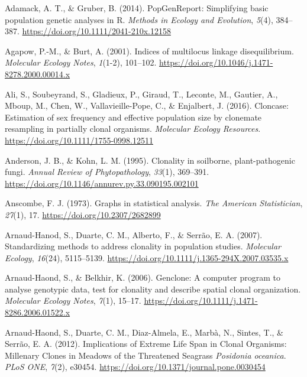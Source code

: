 \documentclass[double,11pt]{beavtex}
\begin{document}
  \hypertarget{refs}{}
  \hypertarget{ref-adamack2014popgenreport}{}
  Adamack, A. T., \& Gruber, B. (2014). PopGenReport: Simplifying basic
  population genetic analyses in R. \emph{Methods in Ecology and
  Evolution}, \emph{5}(4), 384--387.
  \url{https://doi.org/10.1111/2041-210x.12158}
  
  \hypertarget{ref-Agapow_2001}{}
  Agapow, P.-M., \& Burt, A. (2001). Indices of multilocus linkage
  disequilibrium. \emph{Molecular Ecology Notes}, \emph{1}(1-2), 101--102.
  \url{https://doi.org/10.1046/j.1471-8278.2000.00014.x}
  
  \hypertarget{ref-ali2016cloncase}{}
  Ali, S., Soubeyrand, S., Gladieux, P., Giraud, T., Leconte, M., Gautier,
  A., Mboup, M., Chen, W., Vallavieille-Pope, C., \& Enjalbert, J. (2016).
  Cloncase: Estimation of sex frequency and effective population size by
  clonemate resampling in partially clonal organisms. \emph{Molecular
  Ecology Resources}. \url{https://doi.org/10.1111/1755-0998.12511}
  
  \hypertarget{ref-anderson1995clonality}{}
  Anderson, J. B., \& Kohn, L. M. (1995). Clonality in soilborne,
  plant-pathogenic fungi. \emph{Annual Review of Phytopathology},
  \emph{33}(1), 369--391.
  \url{https://doi.org/10.1146/annurev.py.33.090195.002101}
  
  \hypertarget{ref-anscombe1973graphs}{}
  Anscombe, F. J. (1973). Graphs in statistical analysis. \emph{The
  American Statistician}, \emph{27}(1), 17.
  \url{https://doi.org/10.2307/2682899}
  
  \hypertarget{ref-arnaud2007standardizing}{}
  Arnaud-Hanod, S., Duarte, C. M., Alberto, F., \& Serrão, E. A. (2007).
  Standardizing methods to address clonality in population studies.
  \emph{Molecular Ecology}, \emph{16}(24), 5115--5139.
  \url{https://doi.org/10.1111/j.1365-294X.2007.03535.x}
  
  \hypertarget{ref-arnaud2006genclone}{}
  Arnaud-Haond, S., \& Belkhir, K. (2006). Genclone: A computer program to
  analyse genotypic data, test for clonality and describe spatial clonal
  organization. \emph{Molecular Ecology Notes}, \emph{7}(1), 15--17.
  \url{https://doi.org/10.1111/j.1471-8286.2006.01522.x}
  
  \hypertarget{ref-arnaud2012implications}{}
  Arnaud-Haond, S., Duarte, C. M., Diaz-Almela, E., Marbà, N., Sintes, T.,
  \& Serrão, E. A. (2012). Implications of Extreme Life Span in Clonal
  Organisms: Millenary Clones in Meadows of the Threatened Seagrass
  \emph{Posidonia oceanica}. \emph{PLoS ONE}, \emph{7}(2), e30454.
  \url{https://doi.org/10.1371/journal.pone.0030454}
  
\end{document}
